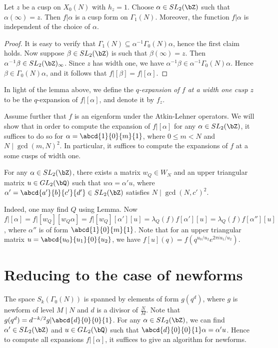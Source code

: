 \documentclass [11pt, proquest] {uwthesis}[2015/03/03]
\begin{document}
\begin{Lemma}
Let $z$ be a cusp on $X_0(N)$ with $h_z = 1$. Choose $\alpha \in SL_2(\bZ)$ such that 
$\alpha(\infty) =z$. Then $f | \alpha$ is a cusp form on $\Gamma_1(N)$. Moreover, the function $f|\alpha $ is independent of the choice of $\alpha$. 
\end{Lemma}

\begin{proof}
It is easy to verify that $\Gamma_1(N) \subseteq \alpha^{-1} \Gamma_0(N) \alpha$, hence the first claim holds. Now suppose $\beta \in SL_2(\bZ)$ is such that $\beta(\infty) = z$. Then $\alpha^{-1} \beta \in SL_2(\bZ)_\infty$. Since $z$ has width one, we have $\alpha^{-1} \beta \in \alpha^{-1}\Gamma_0(N) \alpha$. Hence $\beta \in \Gamma_0(N) \alpha$, and it follows that $f | [\beta] = f | [\alpha]$.
\end{proof}

In light of the lemma above, we define the {\it $q$-expansion of $f$ at a width one cusp $z$} to be the $q$-expansion of $f | [\alpha]$, and denote it by $f_z$. 


Assume further that $f$ is an eigenform under the Atkin-Lehner operators. We will show that in order to compute the expansion of $f|[\alpha]$ for any $\alpha \in SL_2(\bZ)$, it suffices to do so for $\alpha = \abcd{1}{0}{m}{1}$, where $0 \leq m < N$ and $N \mid \gcd(m,N)^2$. In particular, it suffices to compute the expansions of $f$ at a some cusps of width one.

\begin{Lemma}
For any $\alpha \in SL_2(\bZ)$, there exists a matrix $w_Q \in W_N$ and an upper triangular matrix $u \in GL_2(\bQ)$
such that $w\alpha = \alpha' u$, where $\alpha' = \abcd{a'}{b}{c'}{d'} \in SL_2(\bZ)$ satisfies $N \mid \gcd(N,c')^2$.
\end{Lemma}

Indeed, one may find $Q$ using Lemma. Now $f|[\alpha] = f|[w_Q][w_Q\alpha] = f|[w_Q][\alpha'][u] = \lambda_Q(f) f [\alpha'][u] =\lambda_Q(f) f[\alpha''][u]$, where $\alpha''$ is of form $\abcd{1}{0}{m}{1}$. Note that for an upper triangular matrix $u = \abcd{u_0}{u_1}{0}{u_2}$, we have $f[u](q) = f(q^{u_0/u_2} e^{2\pi i u_1/u_2})$.

\section{Reducing to the case of newforms}

The space $S_k(\Gamma_0(N))$ is spanned by elements of form $g(q^d)$, where $g$ is newform of level $M \mid N$ and $d$ is a divisor of $\frac{N}{M}$.  Note that $g(q^d) = d^{-k/2} g | \abcd{d}{0}{0}{1}$. For any $\alpha \in SL_2(\bZ)$, 
we can find $\alpha' \in SL_2(\bZ)$ and $u \in GL_2(\bQ)$ such that $\abcd{d}{0}{0}{1} \alpha  = \alpha' u$. Hence to compute all expansions $f | [\alpha]$, it suffices to give an algorithm for newforms.
\end{document}
